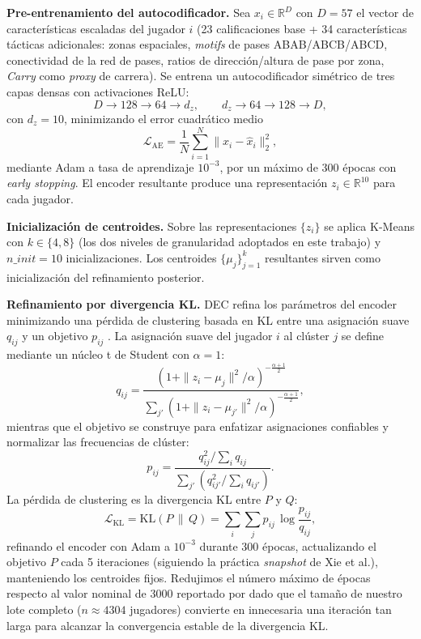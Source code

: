 \documentclass[conference]{IEEEtran}
\begin{document}
\textbf{Pre-entrenamiento del autocodificador.} Sea $x_i \in \mathbb{R}^D$ con $D=57$ el vector de características escaladas del jugador $i$ (23 calificaciones base + 34 características tácticas adicionales: zonas espaciales, \textit{motifs} de pases ABAB/ABCB/ABCD, conectividad de la red de pases, ratios de dirección/altura de pase por zona, \textit{Carry} como \textit{proxy} de carrera). Se entrena un autocodificador simétrico de tres capas densas con activaciones ReLU:
\begin{equation}
D \rightarrow 128 \rightarrow 64 \rightarrow d_z, \qquad d_z \rightarrow 64 \rightarrow 128 \rightarrow D,
\label{eq:ae_arch}
\end{equation}
con $d_z = 10$, minimizando el error cuadrático medio
\begin{equation}
\mathcal{L}_{\mathrm{AE}} = \frac{1}{N}\sum_{i=1}^{N}\|x_i - \hat{x}_i\|_2^2,
\label{eq:ae_loss}
\end{equation}
mediante Adam a tasa de aprendizaje $10^{-3}$, por un máximo de 300 épocas con \textit{early stopping}. El encoder resultante produce una representación $z_i \in \mathbb{R}^{10}$ para cada jugador.

\textbf{Inicialización de centroides.}	Sobre las representaciones $\{z_i\}$ se aplica K-Means con $k \in \{4, 8\}$ (los dos niveles de granularidad adoptados en este trabajo) y $n\_init = 10$ inicializaciones. Los centroides $\{\mu_j\}_{j=1}^{k}$ resultantes sirven como inicialización del refinamiento posterior.

\textbf{Refinamiento por divergencia KL.} DEC refina los parámetros del encoder minimizando una pérdida de clustering basada en KL entre una asignación suave $q_{ij}$ y un objetivo $p_{ij}$ \citep{demir2026how}. La asignación suave del jugador $i$ al clúster $j$ se define mediante un núcleo t de Student con $\alpha = 1$:
\begin{equation}
q_{ij} = \frac{\left(1 + \|z_i - \mu_j\|^2 / \alpha\right)^{-\frac{\alpha+1}{2}}}{\sum_{j'}\left(1 + \|z_i - \mu_{j'}\|^2 / \alpha\right)^{-\frac{\alpha+1}{2}}},
\label{eq:q_soft}
\end{equation}
mientras que el objetivo se construye para enfatizar asignaciones confiables y normalizar las frecuencias de clúster:
\begin{equation}
p_{ij} = \frac{q_{ij}^2 / \sum_i q_{ij}}{\sum_{j'}\left(q_{ij'}^2 / \sum_i q_{ij'}\right)}.
\label{eq:p_target}
\end{equation}
La pérdida de clustering es la divergencia KL entre $P$ y $Q$:
\begin{equation}
\mathcal{L}_{\mathrm{KL}} = \mathrm{KL}(P \,\|\, Q) = \sum_i \sum_j p_{ij}\,\log\!\frac{p_{ij}}{q_{ij}},
\label{eq:kl_loss}
\end{equation}
refinando el encoder con Adam a $10^{-3}$ durante 300 épocas, actualizando el objetivo $P$ cada 5 iteraciones (siguiendo la práctica \textit{snapshot} de Xie et al.), manteniendo los centroides fijos. Redujimos el número máximo de épocas respecto al valor nominal de 3000 reportado por \citeauthor{demir2026how} dado que el tamaño de nuestro lote completo ($n \approx 4304$ jugadores) convierte en innecesaria una iteración tan larga para alcanzar la convergencia estable de la divergencia KL.
\end{document}
